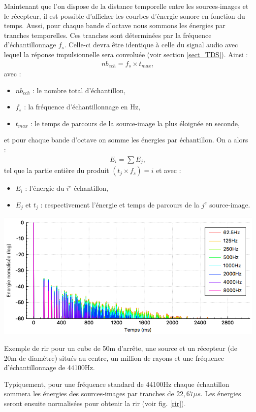 Maintenant que l'on dispose de la distance temporelle entre les sources-images et le récepteur, il est possible d'afficher les courbes d'énergie sonore en fonction du temps. Aussi, pour chaque bande d'octave nous sommons les énergies par tranches temporelles. Ces tranches sont déterminées par la fréquence d'échantillonnage $f_s$. Celle-ci devra être identique à celle du signal audio avec lequel la réponse impulsionnelle sera convoluée (voir section \ref{sect_TDS}). Ainsi :
\begin{align}
nb_{ech} = f_s \times t_{max}, 
\end{align}
avec : 
\begin{itemize}
\item$nb_{ech}$ : le nombre total d'échantillon,
\item$f_s$ : la fréquence d'échantillonnage en Hz,
\item$t_{max}$ : le temps de parcours de la source-image la plus éloignée en seconde,
\end{itemize}
%
et pour chaque bande d'octave on somme les énergies par échantillon. On a alors : 
%
\begin{align}
E_{i} =  \sum{E_j},
\end{align}
tel que la partie entière du produit  $(t_j \times f_s) = i$
et avec : 
\begin{itemize}
\item$E_{i}$ : l'énergie du $i^e$ échantillon,
\item$E_j$ et $t_j$ : respectivement l'énergie et temps de parcours de la $j^e$ source-image.
\end{itemize}
%
 \begin{figureth}
	\includegraphics[width=\linewidth]{images/rir}
	\caption[Réponse impulsionnelle d'un cube.]{Exemple de \gls{rir} pour un cube de 50m d'arrête, une source et un récepteur (de 20m de diamètre) situés au centre, un million de rayons et une fréquence d'échantillonnage de 44100Hz.}
	\label{rir}
\end{figureth}
%
Typiquement, pour une fréquence standard de 44100Hz chaque échantillon sommera les énergies des sources-images par tranches de $22,67\mu s$. Les énergies seront ensuite normalisées pour obtenir la \gls{rir} (voir fig. \ref{rir}).

